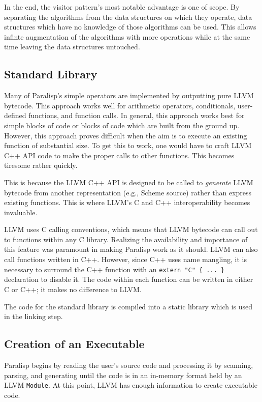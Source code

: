 \documentclass[
abstracton,
fontsize=12pt,
]{scrartcl}
\begin{document}
In the end, the visitor pattern's most notable advantage is one of scope. By separating the algorithms from the data structures on which they operate, data structures which have no knowledge of those algorithms can be used. This allows infinte augmentation of the algorithms with more operations while at the same time leaving the data structures untouched.

\subsection{Standard Library}

Many of Paralisp's simple operators are implemented by outputting pure LLVM bytecode. This approach works well for arithmetic operators, conditionals, user-defined functions, and function calls. In general, this approach works best for simple blocks of code or blocks of code which are built from the ground up. However, this approach proves difficult when the aim is to execute an existing function of substantial size. To get this to work, one would have to craft LLVM C++ API code to make the proper calls to other functions. This becomes tiresome rather quickly.

This is because the LLVM C++ API is designed to be called to \emph{generate} LLVM bytecode from another representation (e.g., Scheme source) rather than express existing functions. This is where LLVM's C and C++ interoperability becomes invaluable.

LLVM uses C calling conventions, which means that LLVM bytecode can call out to functions within any C library. Realizing the availability and importance of this feature was paramount in making Paralisp work as it should. LLVM can also call functions written in C++. However, since C++ uses name mangling, it is necessary to surround the C++ function with an \verb|extern "C" { ... }| declaration to disable it. The code within each function can be written in either C or C++; it makes no difference to LLVM.

The code for the standard library is compiled into a static library which is used in the linking step.

\subsection{Creation of an Executable}

Paralisp begins by reading the user's source code and processing it by scanning, parsing, and generating until the code is in an in-memory format held by an LLVM \verb|Module|. At this point, LLVM has enough information to create executable code.
\end{document}
